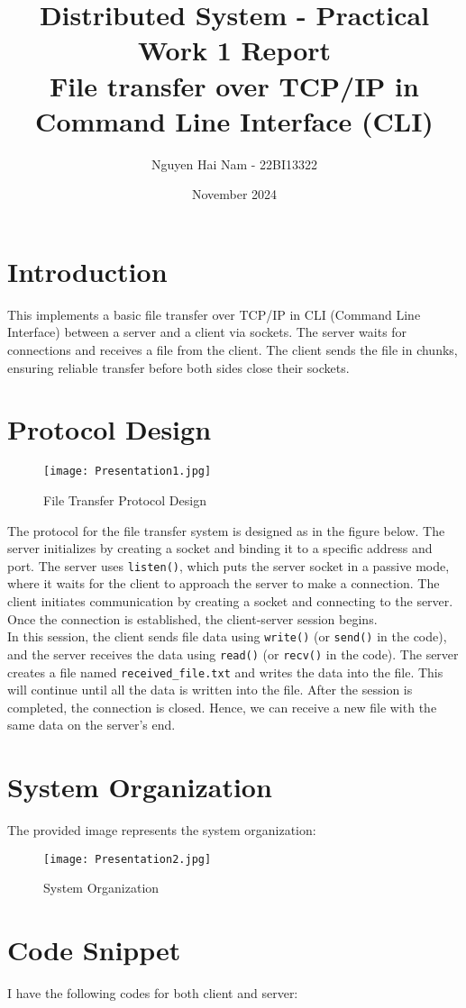 \documentclass{article}
\title{Distributed System - Practical Work 1 Report \\ \large File transfer over TCP/IP in Command Line Interface (CLI)}
\author{Nguyen Hai Nam - 22BI13322}
\date{November 2024}
\begin{document}
\maketitle

\section{Introduction}
This implements a basic file transfer over TCP/IP in CLI (Command Line Interface) between a server and a client via sockets. The server waits for connections and receives a file from the client. The client sends the file in chunks, ensuring reliable transfer before both sides close their sockets.
\section{Protocol Design}
\begin{figure}[H]
    \centering
    \texttt{[image: Presentation1.jpg]}
    \caption{File Transfer Protocol Design}
\end{figure}
The protocol for the file transfer system is designed as in the figure below. The server initializes by creating a socket and binding it to a specific address and port. The server uses \texttt{listen()}, which puts the server socket in a passive mode, where it waits for the client to approach the server to make a connection. The client initiates communication by creating a socket and connecting to the server. Once the connection is established, the client-server session begins. 
\\In this session, the client sends file data using \texttt{write()} (or \texttt{send()} in the code), and the server receives the data using \texttt{read()} (or \texttt{recv()} in the code). The server creates a file named \texttt{received\_file.txt} and writes the data into the file. This will continue until all the data is written into the file. After the session is completed, the connection is closed. Hence, we can receive a new file with the same data on the server's end.
\section{System Organization}
The provided image represents the system organization:
\begin{figure}[H]
    \centering
    \texttt{[image: Presentation2.jpg]}
    \caption{System Organization}
\end{figure}
\section{Code Snippet}
I have the following codes for both client and server:
\end{document}
